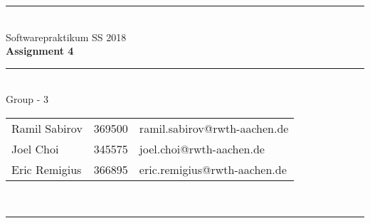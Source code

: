 \documentclass[a4paper,12pt]{article}
\begin{document}
\begin{center}
	\rule{\textwidth}{0.1pt}\\[1cm]
	
	\Large Softwarepraktikum SS 2018\\\bf Assignment 4 %
\end{center}


\begin{center}

	\rule{\textwidth}{0.1pt}\\[0.5cm]

	{\Large Group - 3\\[5mm]} %

	\begin{tabular}{lll}
		Ramil Sabirov & 369500 & ramil.sabirov@rwth-aachen.de\\

		Joel Choi & 345575 & joel.choi@rwth-aachen.de \\

		Eric Remigius & 366895 & eric.remigius@rwth-aachen.de \\

	\end{tabular}\\[0.5cm]

	\rule{\textwidth}{0.1pt}\\[1cm]

\end{center}





\end{document}

